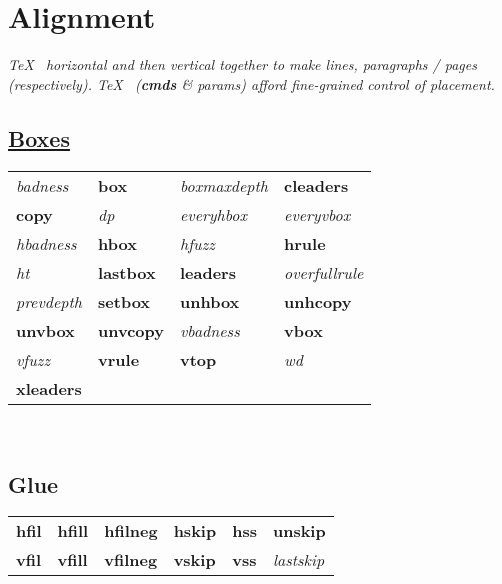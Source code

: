 \section{Alignment}
\textit{\TeX\  horizontal and then vertical  together to make lines, paragraphs / pages (respectively). \TeX\  (\textbf{cmds} \& \textit{params}) afford fine-grained control of placement.}

\subsection*{\href{https://en.wikibooks.org/wiki/LaTeX/Boxes}{Boxes}\textsuperscript{\textdagger}}


{\scriptsize\begin{tabular}{@{}l l l l}
    \textit{badness}         &
    \textbf{box}             &
    \textit{boxmaxdepth}     &
    \textbf{cleaders}        \\
    \textbf{copy}            &
    \textit{dp}              &
    \textit{everyhbox}       &
    \textit{everyvbox}       \\
    \textit{hbadness}        &
    \textbf{hbox}            &
    \textit{hfuzz}           &
    \textbf{hrule}           \\
    \textit{ht}              &
    \textbf{lastbox}         &
    \textbf{leaders}         &
    \textit{overfullrule}    \\
    \textit{prevdepth}       &
    \textbf{setbox}          &
    \textbf{unhbox}          &
    \textbf{unhcopy}         \\
    \textbf{unvbox}          &
    \textbf{unvcopy}         &
    \textit{vbadness}        &
    \textbf{vbox}            \\
    \textit{vfuzz}           &
    \textbf{vrule}           &
    \textbf{vtop}            &
    \textit{wd}              \\
    \textbf{xleaders}        &
\end{tabular}} \\


\subsection*{Glue\textsuperscript{\textdagger}}

{\scriptsize\begin{tabular}{@{}l l l l l l}
    \textbf{hfil}               &
    \textbf{hfill}              &
    \textbf{hfilneg}            &
    \textbf{hskip}              &
    \textbf{hss}                &
    \textbf{unskip}             \\
    \textbf{vfil}               &
    \textbf{vfill}              &
    \textbf{vfilneg}            &
    \textbf{vskip}              &
    \textbf{vss}                &
    \textit{lastskip}           \\
\end{tabular}}



